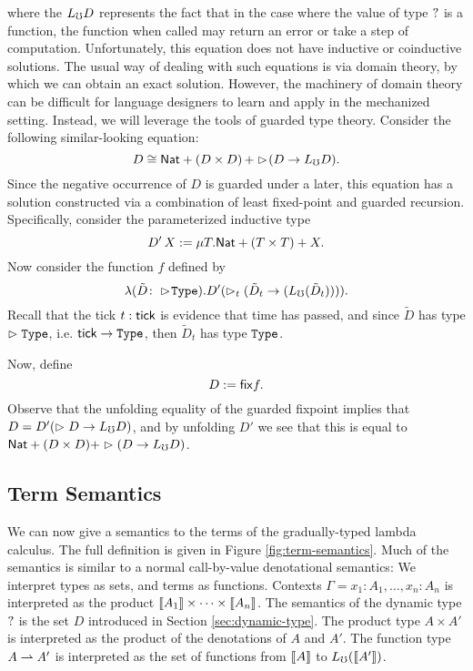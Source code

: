 where the $L_\mho D$ represents the fact that in the case where the value of type
$?$ is a function, the function when called may return an error or take a
step of computation. Unfortunately, this equation does not have inductive or
coinductive solutions. The usual way of dealing with such equations is via
domain theory, by which we can obtain an exact solution. However, the machinery
of domain theory can be difficult for language designers to learn and apply in
the mechanized setting. Instead, we will leverage the tools of guarded type
theory. Consider the following similar-looking equation:
%
\[ D \cong \mathsf{Nat} + (D \times D)\, + \vartriangleright \hspace{-0.2em} (D \to L_\mho D). \]
%
Since the negative occurrence of $D$ is guarded under a later, this equation has
a solution constructed via a combination of least fixed-point and guarded
recursion. Specifically, consider the parameterized inductive type
%
\[ D'\, X := \mu T. \mathsf{Nat} + (T \times T) + X. \]
%
Now consider the function $f$ defined by
%
\[ \lambda (\tilde{D} \colon \vartriangleright \hspace{-0.2em} \texttt{Type}) . D' (\vartriangleright_t (\tilde{D}_t \to (L_\mho (\tilde{D}_t)))). \]
%
Recall that the tick $t : \mathsf{tick}$ is evidence that time has passed, and since
$\tilde{D}$ has type $\vartriangleright \texttt{Type}$, i.e. $\mathsf{tick} \to \texttt{Type}$, then $\tilde{D}_t$
has type $\texttt{Type}$.

Now, define 
\[ D := \mathsf{fix} f. \]
%
Observe that the unfolding equality of the guarded fixpoint implies that $D = D'
(\vartriangleright D \to L_\mho D)$, and by unfolding $D'$ we see that this is equal to $\mathsf{Nat}
+ (D \times D) + \vartriangleright (D \to L_\mho D)$.


\subsection{Term Semantics}\label{sec:term-interpretation}

We can now give a semantics to the terms of the gradually-typed lambda calculus.
The full definition is given in Figure \ref{fig:term-semantics}.
%
Much of the semantics is similar to a normal call-by-value denotational
semantics: We interpret types as sets, and terms as functions. Contexts $\Gamma
= x_1 \colon A_1, \dots, x_n \colon A_n$ is interpreted as the product
$\llbracket {A_1} \rrbracket \times \cdots \times \llbracket {A_n} \rrbracket$. The semantics of the dynamic type
$?$ is the set $D$ introduced in Section \ref{sec:dynamic-type}. The product
type $A \times A'$ is interpreted as the product of the denotations of $A$ and
$A'$. The function type $A \rightharpoonup A'$ is interpreted as the set of functions from
$\llbracket {A} \rrbracket$ to $L_\mho (\llbracket {A'} \rrbracket)$.

